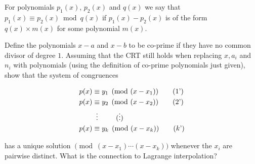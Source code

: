 \documentclass{article}
\begin{document}
\begin{hw}
	For polynomials $p_1 (x)$, $p_2 (x)$ and $q(x)$ we say that $p_1(x) \equiv p_2 (x) \bmod{q(x)}$ if $p_1 (x) - p_2 (x)$ is of the form $q (x) \times m(x)$ for some polynomial $m(x)$.
	
	Define the polynomials $x-a$ and $x-b$ to be co-prime if they have no common divisor
	of degree $1$. Assuming that the CRT still holds when replacing $x, a_i$ and $n_i$ with polynomials (using the definition of co-prime polynomials just given), show that the system of congruences
	
	\begin{align}
		p(x) & \equiv y_1 \pmod{(x-x_1)} \tag{1'} \\
		p(x) & \equiv y_2 \pmod{(x-x_2)} \tag{2'} \\
		&\vdotswithin{\equiv} \tag{$\vdots$}\\
		p(x) & \equiv y_k \pmod{(x-x_k)} \tag{$k$'}
	\end{align}

	has a unique solution $\pmod{(x-x_1)\cdots(x-x_k)}$ whenever the $x_i$ are pairwise
	distinct. What is the connection to Lagrange interpolation?
\end{hw}
\end{document}
